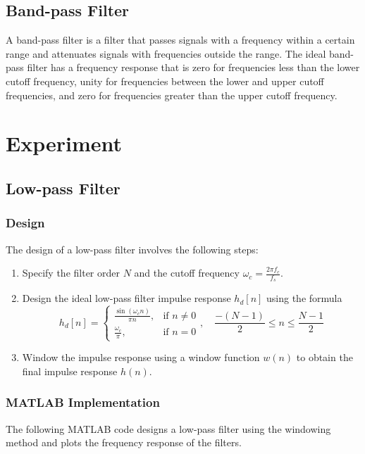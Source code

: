 \documentclass[a4paper,12pt]{article}
\begin{document}
\subsection*{Band-pass Filter}
A band-pass filter is a filter that passes signals with a frequency within
a certain range and attenuates signals with frequencies outside the range.
The ideal band-pass filter has a frequency response that is zero for
frequencies less than the lower cutoff frequency, unity for frequencies
between the lower and upper cutoff frequencies, and zero for frequencies
greater than the upper cutoff frequency.

\section*{Experiment}
\subsection*{Low-pass Filter}
\subsubsection*{Design}
The design of a low-pass filter involves the following steps:
\begin{enumerate}
    \item Specify the filter order $N$ and the cutoff frequency $\omega_c = \frac{2\pi f_c}{f_s}$.
    \item Design the ideal low-pass filter impulse response $h_d[n]$
    using the formula
    \begin{equation*}
        h_{d}[n] = \begin{cases}
            \frac{\sin(\omega_cn)}{\pi n}, & \text{if } n \neq 0 \\
            \frac{\omega_c}{\pi}, & \text{if } n = 0
        \end{cases}, \quad \frac{-(N-1)}{2} \leq n \leq \frac{N-1}{2}
    \end{equation*}
    \item Window the impulse response using a window function $w(n)$ to
    obtain the final impulse response $h(n)$.
\end{enumerate}

\subsubsection*{MATLAB Implementation}
The following MATLAB code designs a low-pass filter
using the windowing method and plots the frequency response of the filters.
\end{document}
